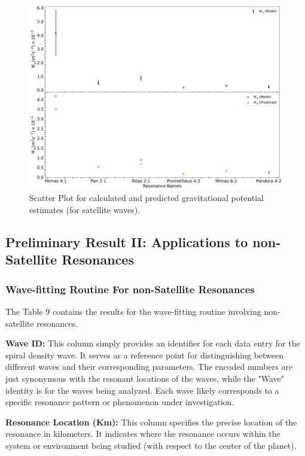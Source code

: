 \documentclass{article}
\begin{document}
\begin{figure}
    \centering
    \includegraphics[width=0.8\linewidth]{calculated_and_predicted_satellite_potential_Main.png}
    \caption{Scatter Plot for calculated and predicted gravitational potential estimates (for satellite waves).}
    \label{fig:enter-label}
\end{figure}


\subsection{Preliminary Result II: Applications to non-Satellite Resonances}

\subsubsection{Wave-fitting Routine For non-Satellite Resonances}
The Table 9 contains the results for the wave-fitting routine involving non-satellite resonances.

\textbf{Wave ID:} This column simply provides an identifier for each data entry for the spiral density wave. It serves as a reference point for distinguishing between different waves and their corresponding parameters. The encoded numbers are just synonymous with the resonant locations of the waves, while the "Wave" identity is for the waves being analyzed. Each wave likely corresponds to a specific resonance pattern or phenomenon under investigation.
    
\textbf{Resonance Location (Km):} This column specifies the precise location of the resonance in kilometers. It indicates where the resonance occurs within the system or environment being studied (with respect to the center of the planet).
    
\end{document}
